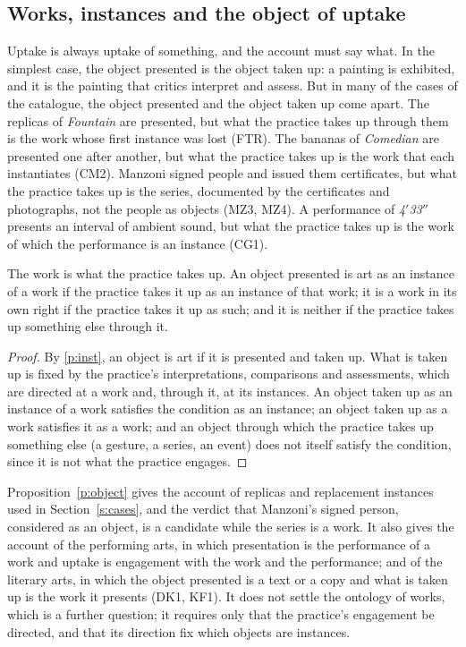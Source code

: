 \documentclass{situationist-preprint}
\begin{document}
\subsection{Works, instances and the object of uptake}

Uptake is always uptake of something, and the account must say what. In the simplest case, the object presented is the object taken up: a painting is exhibited, and it is the painting that critics interpret and assess. But in many of the cases of the catalogue, the object presented and the object taken up come apart. The replicas of \emph{Fountain} are presented, but what the practice takes up through them is the work whose first instance was lost (FTR). The bananas of \emph{Comedian} are presented one after another, but what the practice takes up is the work that each instantiates (CM2). Manzoni signed people and issued them certificates, but what the practice takes up is the series, documented by the certificates and photographs, not the people as objects (MZ3, MZ4). A performance of \emph{4$'$33$''$} presents an interval of ambient sound, but what the practice takes up is the work of which the performance is an instance (CG1).

\begin{proposition}\label{p:object}
The work is what the practice takes up. An object presented is art as an instance of a work if the practice takes it up as an instance of that work; it is a work in its own right if the practice takes it up as such; and it is neither if the practice takes up something else through it.
\end{proposition}

\begin{proof}
By \ref{p:inst}, an object is art if it is presented and taken up. What is taken up is fixed by the practice's interpretations, comparisons and assessments, which are directed at a work and, through it, at its instances. An object taken up as an instance of a work satisfies the condition as an instance; an object taken up as a work satisfies it as a work; and an object through which the practice takes up something else (a gesture, a series, an event) does not itself satisfy the condition, since it is not what the practice engages.
\end{proof}

Proposition~\ref{p:object} gives the account of replicas and replacement instances used in Section~\ref{s:cases}, and the verdict that Manzoni's signed person, considered as an object, is a candidate while the series is a work. It also gives the account of the performing arts, in which presentation is the performance of a work and uptake is engagement with the work and the performance; and of the literary arts, in which the object presented is a text or a copy and what is taken up is the work it presents (DK1, KF1). It does not settle the ontology of works, which is a further question; it requires only that the practice's engagement be directed, and that its direction fix which objects are instances.
\end{document}
